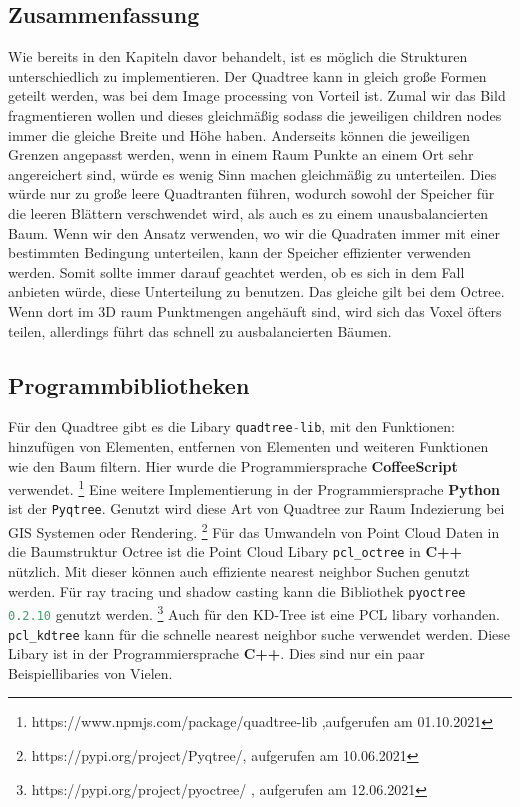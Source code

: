 \documentclass[11pt]{article}
\newcommand{\qt}{Quadtree }
\newcommand{\oc}{Octree }
\newcommand{\kd}{KD-Tree }
\newcommand{\fett}[1]{{\bf #1}}
\newcommand{\lstin}[1]{\lstinline[language=C]{#1}}
\begin{document}
\subsection{Zusammenfassung}
Wie bereits in den Kapiteln davor behandelt, ist es möglich die Strukturen unterschiedlich zu implementieren. 
Der \qt kann in gleich große Formen geteilt werden, was bei dem Image processing von Vorteil ist. Zumal wir das Bild fragmentieren wollen und dieses gleichmäßig sodass die jeweiligen children nodes immer die gleiche Breite und Höhe haben. Anderseits können die jeweiligen Grenzen angepasst werden, wenn in einem Raum Punkte an einem Ort sehr angereichert sind, würde es wenig Sinn machen gleichmäßig zu unterteilen. 
Dies würde nur zu große leere Quadtranten führen, wodurch sowohl der Speicher für die leeren Blättern verschwendet wird, als auch es zu einem unausbalancierten Baum. 
\newline
Wenn wir den Ansatz verwenden, wo wir die Quadraten immer mit einer bestimmten Bedingung unterteilen, kann der Speicher effizienter verwenden werden.  Somit sollte immer darauf geachtet werden, ob es sich in dem Fall anbieten würde, diese Unterteilung zu benutzen.
Das gleiche gilt bei dem Octree. Wenn dort im 3D raum Punktmengen angehäuft sind, wird sich das Voxel öfters teilen, allerdings führt das schnell zu ausbalancierten Bäumen. 

\subsection{Programmbibliotheken}
 
Für den \qt gibt es die Libary \lstin{quadtree-lib}, mit den Funktionen: hinzufügen von Elementen, entfernen von Elementen und weiteren Funktionen wie den Baum filtern. Hier wurde die Programmiersprache \fett{CoffeeScript} verwendet. \footnote[1]{https://www.npmjs.com/package/quadtree-lib ,aufgerufen am 01.10.2021}
Eine weitere Implementierung in der Programmiersprache \fett{Python} ist der \lstin{Pyqtree}. Genutzt wird diese Art von \qt zur Raum Indezierung bei GIS Systemen oder Rendering. \footnote[2]{https://pypi.org/project/Pyqtree/, aufgerufen am 10.06.2021}
Für das Umwandeln von Point Cloud Daten in die Baumstruktur \oc ist die Point Cloud Libary \lstin{pcl_octree} in \fett{C++} nützlich. Mit dieser können auch effiziente nearest neighbor Suchen genutzt werden. Für ray tracing und shadow casting kann die Bibliothek \lstin{pyoctree 0.2.10} genutzt werden. \footnote[3]{https://pypi.org/project/pyoctree/ , aufgerufen am 12.06.2021}
Auch für den \kd ist eine PCL libary vorhanden. \lstin{pcl_kdtree} kann für die schnelle nearest neighbor suche verwendet werden. Diese Libary ist in der Programmiersprache \fett{C++}. \cite{PointCloudLibary}
Dies sind nur ein paar Beispiellibaries von Vielen.
\end{document}
